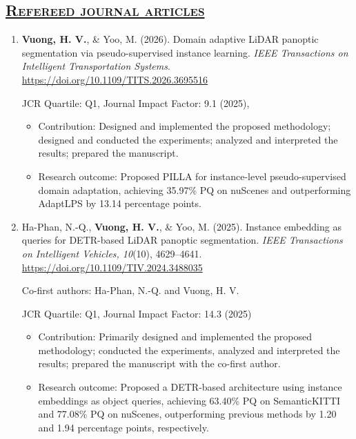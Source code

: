 \documentclass[a4paper,12pt]{article}
\begin{document}
\subsection*{\scshape\underline{Refereed journal articles}}
\begin{enumerate}[
    leftmargin=*,
    labelsep=0.5em,
    align=left
]

  \item
  \textbf{Vuong, H. V.}, \& Yoo, M. (2026).
  Domain adaptive LiDAR panoptic segmentation via pseudo-supervised instance learning.
  \textit{IEEE Transactions on Intelligent Transportation Systems}.
  \href{https://doi.org/10.1109/TITS.2026.3695516}
  {https://doi.org/10.1109/TITS.2026.3695516}

   JCR Quartile: Q1, Journal Impact Factor: 9.1 (2025), 

  \begin{itemize}[leftmargin=1.5em]
      \item Contribution: Designed and implemented the proposed methodology; designed and conducted the experiments; analyzed and interpreted the results; prepared the manuscript.
      \item Research outcome: Proposed PILLA for instance-level pseudo-supervised domain adaptation, achieving 35.97\% PQ on nuScenes and outperforming AdaptLPS by 13.14 percentage points.
  \end{itemize}


  \item
  Ha-Phan, N.-Q., \textbf{Vuong, H. V.}, \& Yoo, M. (2025).
  Instance embedding as queries for DETR-based LiDAR panoptic segmentation.
  \textit{IEEE Transactions on Intelligent Vehicles, 10}(10), 4629--4641.
  \href{https://doi.org/10.1109/TIV.2024.3488035}
  {https://doi.org/10.1109/TIV.2024.3488035}

  Co-first authors: Ha-Phan, N.-Q. and Vuong, H. V.

  JCR Quartile: Q1, Journal Impact Factor: 14.3 (2025)

\begin{itemize}[leftmargin=1.5em]

    \item Contribution: Primarily designed and implemented the proposed methodology; conducted the experiments, analyzed and interpreted the results; prepared the manuscript with the co-first author.
    \item Research outcome: Proposed a DETR-based architecture using instance embeddings as object queries, achieving 63.40\% PQ on SemanticKITTI and 77.08\% PQ on nuScenes, outperforming previous methods by 1.20 and 1.94 percentage points, respectively.
\end{itemize}



\end{enumerate}
\end{document}
